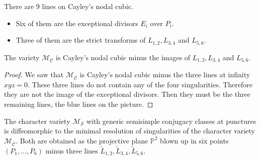 \begin{proposition}\label{prop_lines_cayley}
There are $9$ lines on Cayley's nodal cubic.
\begin{itemize}
\item Six of them are the exceptional divisors $E_i$ over $P_i$.
\item Three of them are the strict transforms of $L_{1,2}, L_{3,4}$ and $L_{5,6}$.
\end{itemize}
\end{proposition}
\begin{proposition}
The variety $\mathcal{M}_{\overline{\boldsymbol{\mathcal{C}}}}$ is Cayley's nodal cubic minus the images of $L_{1,2}, L_{3,4}$ and $L_{5,6}$.
\end{proposition}
\begin{proof}
We saw that $\mathcal{M}_{\overline{\boldsymbol{\mathcal{C}}}}$ is Cayley's nodal cubic minus the three lines at infinity $xyz=0$. These three lines do not contain any of the four singularities. Therefore they are not the image of the exceptional divisors. Then they must be the three remaining lines, the blue lines on the picture.
\end{proof}
\begin{theorem}
The character variety $\mathcal{M}_{\boldsymbol{\mathcal{S}}}$ with generic semisimple conjugacy classes at punctures is diffeomorphic to the minimal resolution of singularities of the character variety $\mathcal{M}_{\overline{\boldsymbol{\mathcal{C}}}}$. Both are obtained as the projective plane $\mathbb{P}^2$ blown up in six points $(P_1,\dots,P_6)$ minus three lines $\widetilde{L}_{1,2}, \widetilde{L}_{3,4}, \widetilde{L}_{5,6}$.
\end{theorem}
